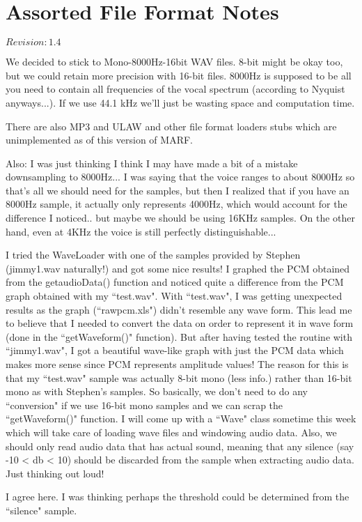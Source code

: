 \section{Assorted File Format Notes}

$Revision: 1.4 $


	We decided to stick to Mono-8000Hz-16bit WAV files.  8-bit might be
	okay too, but we could retain more precision with 16-bit files.  8000Hz is
	supposed to be all you need to contain all frequencies of the vocal
	spectrum
	(according to Nyquist anyways...).  If we use 44.1 kHz we'll just be wasting
	space and computation time.

	There are also MP3 and ULAW and other file format loaders stubs which are unimplemented
	as of this version of MARF.

Also: I was just thinking I think I may have made a bit of a mistake
downsampling to 8000Hz... I was saying that the voice ranges to about 8000Hz so
that's all we should need for the samples, but then I realized that if you have
an 8000Hz sample, it actually only represents 4000Hz, which would account for
the difference I noticed.. but maybe we should be using 16KHz samples.  On the
other hand, even at 4KHz the voice is still perfectly distinguishable...


I tried the WaveLoader with one of the samples provided by Stephen
(jimmy1.wav naturally!) and got some nice results! I graphed the PCM
obtained from the getaudioData() function and noticed quite a difference
from the PCM graph obtained with my ``test.wav". With ``test.wav", I was
getting unexpected results as the graph (``rawpcm.xls") didn't resemble any
wave form. This lead me to believe that I needed to convert the data on
order to represent it in wave form (done in the ``getWaveform()" function).
But after having tested the routine with ``jimmy1.wav", I got a beautiful
wave-like graph with just the PCM data which makes more sense since PCM
represents amplitude values! The reason for this is that my ``test.wav"
sample was actually 8-bit mono (less info.) rather than 16-bit mono as with
Stephen's samples. So basically, we don't need to do any ``conversion" if we
use 16-bit mono samples and we can scrap the ``getWaveform()" function.
I will come up with a ``Wave" class sometime this week which will take care
of loading wave files and windowing audio data. Also, we should only read
audio data that has actual sound, meaning that any silence (say -10 < db <
10) should be discarded from the sample when extracting audio data.
Just thinking out loud!

I agree here.  I was thinking perhaps the threshold could be determined from
the ``silence" sample.


